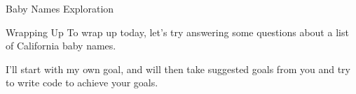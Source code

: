 \documentclass[aspectratio=169]{../latex_main/tntbeamer}  %
\begin{document}
	
	\begin{frame}{Baby Names Exploration}
	    
	\end{frame}
	
	
	\begin{frame}[c]{Wrapping Up}
	    To wrap up today, let’s try answering some questions about a list of California baby names.
	    
	    I’ll start with my own goal, and will then take suggested goals from you and try to write code to achieve your goals.

	\end{frame}
\end{document}

